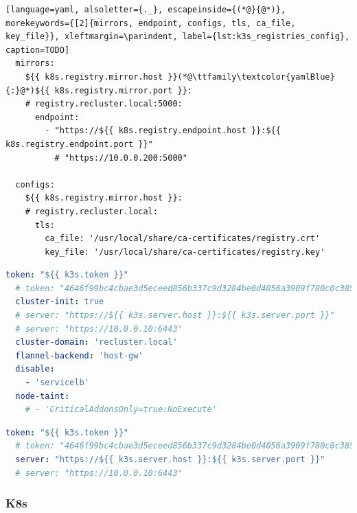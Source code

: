 \begin{lstlisting}[language=yaml, alsoletter={._}, escapeinside={(*@}{@*)}, morekeywords={[2]{mirrors, endpoint, configs, tls, ca_file, key_file}}, xleftmargin=\parindent, label={lst:k3s_registries_config}, caption=TODO]
  mirrors:
    ${{ k8s.registry.mirror.host }}(*@\ttfamily\textcolor{yamlBlue}{:}@*)${{ k8s.registry.mirror.port }}:
    # registry.recluster.local:5000:
      endpoint:
        - "https://${{ k8s.registry.endpoint.host }}:${{ k8s.registry.endpoint.port }}"
          # "https://10.0.0.200:5000"

  configs:
    ${{ k8s.registry.mirror.host }}:
    # registry.recluster.local:
      tls:
        ca_file: '/usr/local/share/ca-certificates/registry.crt'
        key_file: '/usr/local/share/ca-certificates/registry.key'
\end{lstlisting}

\begin{lstlisting}[language=yaml, alsoletter={.-}, morekeywords={[2]{token, cluster-init, cluster-domain, flannel-backend, disable, node-taint}}, xleftmargin=\parindent, label={lst:k3s_controller_config}, caption=TODO]
  token: "${{ k3s.token }}"
  # token: "4646f99bc4cbae3d5eceed856b337c9d3284be0d4056a3909f780c0c385fbf93"
  cluster-init: true
  # server: "https://${{ k3s.server.host }}:${{ k3s.server.port }}"
  # server: "https://10.0.0.10:6443"
  cluster-domain: 'recluster.local'
  flannel-backend: 'host-gw'
  disable:
    - 'servicelb'
  node-taint:
    # - 'CriticalAddonsOnly=true:NoExecute'
\end{lstlisting}

\begin{lstlisting}[language=yaml, alsoletter={.}, morekeywords={[2]{token, server}}, xleftmargin=\parindent, label={lst:k3s_worker_config}, caption=TODO]
  token: "${{ k3s.token }}"
  # token: "4646f99bc4cbae3d5eceed856b337c9d3284be0d4056a3909f780c0c385fbf93"
  server: "https://${{ k3s.server.host }}:${{ k3s.server.port }}"
  # server: "https://10.0.0.10:6443"
\end{lstlisting}

\subsubsection{K8s}
\label{subsubsec:implementation_installer_configuration_filesn_k8s}

